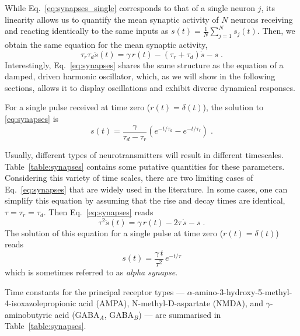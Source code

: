 \documentclass[11pt]{article}
\numberwithin{equation}{section}
\begin{document}
While Eq.~\eqref{eq:synapses_single} corresponds to that of a single neuron $j$, its linearity allows us to  quantify the mean synaptic activity of $N$ neurons receiving and reacting identically to the same inputs as
$
s(t)=\frac{1}{N}\sum_{j=1}^N s_j(t)
$.
Then, we obtain the same equation for the mean synaptic activity,
\begin{equation}\label{eq:synapses}
    \tau_r\tau_d\ddot s(t)= \gamma \, r(t) - (\tau_r+\tau_d) \dot s -s\;.
\end{equation}
Interestingly, Eq.~\eqref{eq:synapses} shares the same structure as the equation of a damped, driven harmonic oscillator, which, as we will show in the following sections, allows it to display oscillations and exhibit diverse dynamical responses.

For a single pulse received at time zero ($r(t)=\delta(t)$), the solution to \eqref{eq:synapses} is
\begin{equation}
s(t)=\frac{\gamma}{\tau_d-\tau_r}\left( e^{-t/\tau_d} - e^{-t/\tau_r}\right)\;.
\end{equation}

Usually, different types of neurotransmitters will result in different timescales.
Table~\ref{table:synapses} contains some putative quantities for these parameters.
Considering this variety of time scales, 
there are two limiting cases of Eq.~\eqref{eq:synapses} that are widely used in the literature.
In some cases, one can simplify this equation by assuming that the rise
and decay times are identical, $\tau=\tau_r=\tau_d$. 
Then Eq.~\ref{eq:synapses} reads
\begin{equation}\label{eq:synapses_2nd}
    \tau^2\ddot s(t)= \gamma \,  r(t) - 2\tau \, \dot s -s\;.
\end{equation}
The solution of this equation for a single pulse at time zero ($r(t)=\delta(t)$)
reads
\begin{equation}
s(t)=\frac{\gamma \, t}{\tau^2}\, e^{-t/\tau}
\end{equation}
which is sometimes referred to as \emph{alpha synapse}.   


Time constants for the principal receptor types — $\alpha$-amino-3-hydroxy-5-methyl-4-isoxazolepropionic acid (AMPA), N-methyl-D-aspartate (NMDA), and $\gamma$-aminobutyric acid (GABA$_A$, GABA$_B$) — are summarised in Table~\ref{table:synapses}.

\end{document}
